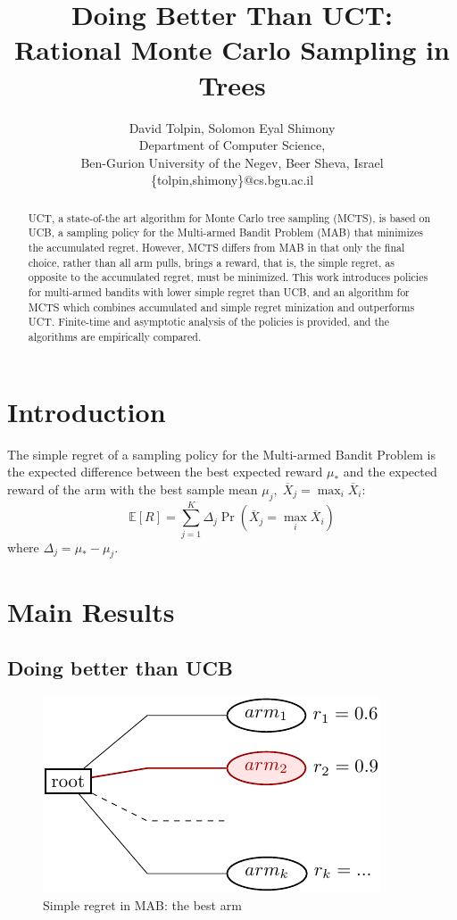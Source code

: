 \documentclass{article}
\title{Doing Better Than UCT: \\ Rational Monte Carlo Sampling in Trees}
\author {David Tolpin, Solomon Eyal Shimony \\
Department of Computer Science, \\
Ben-Gurion University of the Negev, Beer Sheva, Israel \\
\{tolpin,shimony\}@cs.bgu.ac.il}
\newcommand {\IE} {\ensuremath {\mathbb{E}}}
\begin{document}
\maketitle

\begin{abstract}
UCT, a state-of-the art algorithm for Monte Carlo tree sampling
(MCTS), is based on UCB, a sampling policy for the Multi-armed Bandit
Problem (MAB) that minimizes the accumulated regret. However, MCTS
differs from MAB in that only the final choice, rather than all arm
pulls, brings a reward, that is, the simple regret, as opposite to the
accumulated regret, must be minimized. This work introduces policies for
multi-armed bandits with lower simple regret than UCB, and an
algorithm for MCTS which combines accumulated and simple regret
minization and outperforms UCT. Finite-time and asymptotic analysis of
the policies is provided, and the algorithms are empirically compared.
\end{abstract}


\section{Introduction}

The simple regret of a sampling policy for the Multi-armed Bandit
Problem is the expected difference between the best expected reward
$\mu_*$ and the expected reward of the arm with the best sample mean
$\mu_j,\;\overline X_j=\max_i\overline X_i$:
\begin{equation}
\label{eq:simple-regret}
\IE[R]=\sum_{j=1}^K\Delta_j\Pr(\overline X_j=\max_i\overline X_i)
\end{equation}
where $\Delta_j=\mu_*-\mu_j$.

\section{Main Results}

\subsection{Doing better than UCB}

\begin{figure}[t]
\centering
\includegraphics[scale=1.2]{onelevel-tree.pdf}
\caption{Simple regret in MAB: the best arm}
\label{fig:onelevel-tree}
\end{figure}
\end{document}
